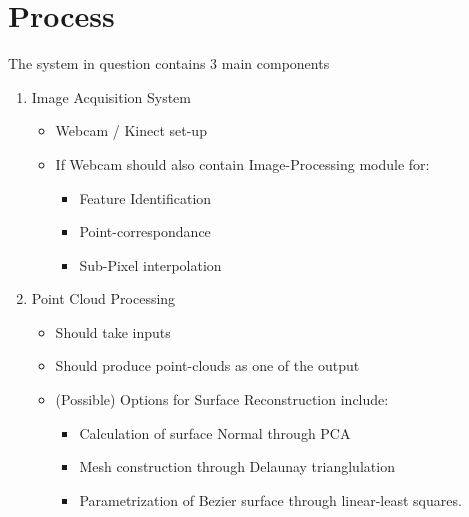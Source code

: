 \documentclass{report}
\begin{document}
\chapter{Process}
The system in question contains 3 main components
\begin{enumerate}
	\item Image Acquisition System
	\begin{itemize}
		\item Webcam / Kinect set-up
		\item If Webcam should also contain Image-Processing module for:
		\begin{itemize}
			\item Feature Identification
			\item Point-correspondance
			\item Sub-Pixel interpolation
		\end{itemize}
	\end{itemize}
	\item Point Cloud Processing
	\begin{itemize}
		\item Should take inputs
		\item Should produce point-clouds as one of the output
		\item (Possible) Options for Surface Reconstruction include:
		\begin{itemize}
			\item Calculation of surface Normal through PCA
			\item Mesh construction through Delaunay trianglulation
			\item Parametrization of Bezier surface through linear-least squares.
		\end{itemize}

	\end{itemize}

\end{enumerate}

\begin{equation*}
\end{equation*}
\end{document}
